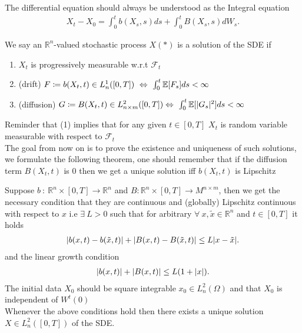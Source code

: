 \begin{remark}
 The differential equation should always be understood as the Integral equation 
 \begin{align*}
  X_t - X_{0} = \int_0^{t}  b(X_s,s) ds + \int_0^{t} B(X_s,s) dW_s 
 .\end{align*}
\end{remark}
\begin{definition}[Solution]
 We say an $\mathbb{R}^{n} $-valued stochastic process $X(*)$ is a solution of the SDE if 
 \begin{enumerate}
  \item $X_t$ is progressively measurable w.r.t $\mathcal{F}_t$
  \item (drift) $F\coloneqq b(X_t,t) \in  L_{n}^{1}([0,T]) \ \Leftrightarrow \  \int_0^{t} \mathbb{E}[F_s] ds < \infty $ 
  \item (diffusion) $G\coloneqq B(X_t,t) \in  L_{n \times m}^{2}([0,T]) \Leftrightarrow \  \int_0^{t} \mathbb{E}[\lvert G_s\rvert^2] ds < \infty $ 
 \end{enumerate}
\end{definition}
Reminder that (1) implies that for any given $t \in  [0,T]$ $X_t$ is random variable measurable with respect to $\mathcal{F}_t$\\[1ex]
The goal from now on is to prove the existence and uniqueness of such solutions, we formulate the following theorem,
one should remember that if the diffusion term $B(X_t,t)$ is 0 then we get a unique solution iff $b(X_t,t)$ is Lipschitz
\begin{theorem}
  Suppose $b \ : \ \mathbb{R}^{n} \times  [0,T] \to  \mathbb{R}^{n}  $ and $B : \mathbb{R}^{n} \times  [0,T] \to  M^{n \times m}  $,
  then we get the necessary condition that they are continuous and (globally) Lipschitz continuous with respect to $x$ i.e $\exists  \ L > 0$ such that
  for arbitrary $\forall  \ x , \tilde{x} \in  \mathbb{R}^{n}  $ and $t \in  [0,T]$ it holds
  \begin{align*}
    \lvert b(x,t) - b(\tilde{x},t )\rvert +  \lvert B(x ,t) - B(\tilde{x},t )\rvert \le  L \lvert x - \tilde{x} \rvert
  .\end{align*}
  and  the linear growth condition 
  \begin{align*}
    \lvert b(x,t)\rvert + \lvert B(x,t)\rvert \le  L(1+\lvert x\rvert) 
  .\end{align*}
  The initial data $X_{0}$ should be square integrable $x_{0} \in  L_n^{2}(\Omega ) $ and that $X_0$ is independent of $W^{t}(0)$ \\[1ex]
  Whenever the above conditions hold then there exists a unique solution $X \in  L^2_n([0,T])$ of the SDE.
\end{theorem}
